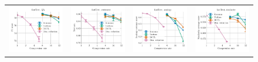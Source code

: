 \begin{figure}
\begin{tabular}{@{\hskip -0.0in}c@{\hskip -0.0in}c@{\hskip -0.0in}c@{\hskip -0.0in}c@{\hskip -0.0in}}
		\includegraphics[width=.245\linewidth]{figures/fasttext1m_qa_best-f1_vs_compression_linx_stoc.pdf} &
		\includegraphics[width=.245\linewidth]{figures/fasttext1m_sentiment_sst_test-acc_vs_compression_linx_stoc.pdf} &
		\includegraphics[width=.245\linewidth]{figures/fasttext1m_intrinsics_analogy-avg-score_vs_compression_linx_stoc.pdf} &
		\includegraphics[width=.245\linewidth]{figures/fasttext1m_intrinsics_similarity-avg-score_vs_compression_linx_stoc.pdf} \\


\end{tabular}
\end{figure}
